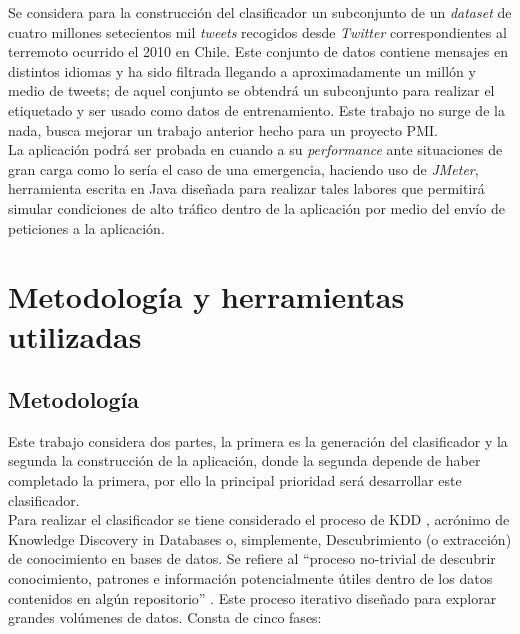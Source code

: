 Se considera para la construcción del clasificador un subconjunto de un \textit{dataset} de cuatro millones setecientos mil \textit{tweets} recogidos desde \textit{Twitter} correspondientes al terremoto ocurrido el 2010 en Chile. Este conjunto de datos contiene mensajes en distintos idiomas y ha sido filtrada llegando a aproximadamente un millón y medio de tweets; de aquel conjunto se obtendrá un subconjunto para realizar el etiquetado y ser usado como datos de entrenamiento. Este trabajo no surge de la nada, busca mejorar un trabajo anterior hecho para un proyecto PMI. \\

La aplicación podrá ser probada en cuando a su \textit{performance} ante situaciones de gran carga como lo sería el caso de una emergencia, haciendo uso de \textit{JMeter}, herramienta escrita en Java diseñada para realizar tales labores que permitirá simular condiciones de alto tráfico dentro de la aplicación por medio del envío de peticiones a la aplicación.


\section{Metodología y herramientas utilizadas}
\label{intro:metodologia}

\subsection{Metodología}
Este trabajo considera dos partes, la primera es la generación del clasificador y la segunda la construcción de la aplicación, donde la segunda depende de haber completado la primera, por ello la principal prioridad será desarrollar este clasificador.\\

Para realizar el clasificador se tiene considerado el proceso de KDD \cite{KDDFayyad}, acrónimo de Knowledge Discovery in Databases o, simplemente, Descubrimiento (o extracción) de conocimiento en bases de datos. Se refiere al “proceso no-trivial de descubrir conocimiento, patrones e información potencialmente útiles dentro de los datos contenidos en algún repositorio” \cite{KDDDefinicion}. Este proceso iterativo diseñado para explorar grandes volúmenes de datos. Consta de cinco fases:\\

